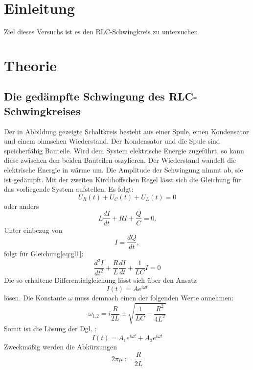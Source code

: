\section{Einleitung}
Ziel dieses Versuchs ist es den RLC-Schwingkreis zu untersuchen.
\section{Theorie}
\label{sec:Theorie}
\subsection{Die gedämpfte Schwingung des RLC-Schwingkreises}
Der in Abbildung gezeigte Schaltkreis besteht aus einer Spule, einen Kondensator und einem ohmschen Wiederstand.
Der Kondensator und die Spule sind speicherfähig Bauteile.
Wird dem System elektrische Energie zugeführt, so kann diese zwischen den beiden Bauteilen oszylieren.
Der Wiederstand wandelt die elektrische Energie in wärme um.
Die Amplitude der Schwingung nimmt ab, sie ist gedämpft.
Mit der zweiten Kirchhoffschen Regel lässt sich die Gleichung für das vorliegende System aufstellen.
Es folgt:
\begin{equation}
  U_R(t)+U_C(t)+U_L(t) = 0
\end{equation}
oder anders
\begin{equation}
  \label{eq:gl1}
  L\frac{dI}{dt}+RI+\frac{Q}{C}=0 .
\end{equation}
Unter einbezug von
\begin{equation}
  I = \frac{dQ}{dt} ,
\end{equation}
folgt für Gleichung\eqref{eq:gl1}:
\begin{equation}
  \label{eq:gl2}
  \frac{d^2I}{dt^2}+\frac{R}{L}\frac{dI}{dt}+\frac{1}{LC}I =0
\end{equation}
 Die so erhaltene Differentialgleichung lässt sich über den Ansatz
 \begin{equation}
   \label{eq:gl3}
   I(t) = A e^{i\omega t}
 \end{equation}
lösen.
Die Konstante $\omega$ muss demnach einen der folgenden Werte annehmen:
\begin{equation}
  \omega_\text{1,2} = i \frac{R}{2L} \pm \sqrt{\frac{1}{LC} - \frac{R^2}{4L^2}}
\end{equation}
Somit ist die Lösung der Dgl. :
\begin{equation}
  I(t) = A_1 e^{i \omega t} + A_2 e^{i \omega t}
\end{equation}
Zweckmäßig werden die Abkürzungen
\begin{equation*}
  2\pi \mu := \frac{R}{2L}
\end{equation*}
